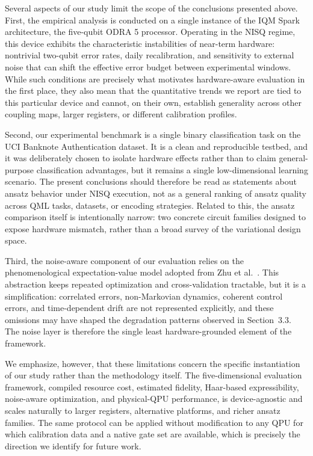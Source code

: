 \documentclass[11pt]{article}
\begin{document}
Several aspects of our study limit the scope of the conclusions presented above. First, the empirical analysis is conducted on a single instance of the IQM Spark architecture, the five-qubit ODRA 5 processor. Operating in the NISQ regime, this device exhibits the characteristic instabilities of near-term hardware: nontrivial two-qubit error rates, daily recalibration, and sensitivity to external noise that can shift the effective error budget between experimental windows. While such conditions are precisely what motivates hardware-aware evaluation in the first place, they also mean that the quantitative trends we report are tied to this particular device and cannot, on their own, establish generality across other coupling maps, larger registers, or different calibration profiles.

Second, our experimental benchmark is a single binary classification task on the UCI Banknote Authentication dataset. It is a clean and reproducible testbed, and it was deliberately chosen to isolate hardware effects rather than to claim general-purpose classification advantages, but it remains a single low-dimensional learning scenario. The present conclusions should therefore be read as statements about ansatz behavior under NISQ execution, not as a general ranking of ansatz quality across QML tasks, datasets, or encoding strategies. Related to this, the ansatz comparison itself is intentionally narrow: two concrete circuit families designed to expose hardware mismatch, rather than a broad survey of the variational design space.

Third, the noise-aware component of our evaluation relies on the phenomenological expectation-value model adopted from Zhu et al.~\cite{zhu2026}. This abstraction keeps repeated optimization and cross-validation tractable, but it is a simplification: correlated errors, non-Markovian dynamics, coherent control errors, and time-dependent drift are not represented explicitly, and these omissions may have shaped the degradation patterns observed in Section~3.3. The noise layer is therefore the single least hardware-grounded element of the framework.

We emphasize, however, that these limitations concern the specific instantiation of our study rather than the methodology itself. The five-dimensional evaluation framework, compiled resource cost, estimated fidelity, Haar-based expressibility, noise-aware optimization, and physical-QPU performance, is device-agnostic and scales naturally to larger registers, alternative platforms, and richer ansatz families. The same protocol can be applied without modification to any QPU for which calibration data and a native gate set are available, which is precisely the direction we identify for future work.
\end{document}
